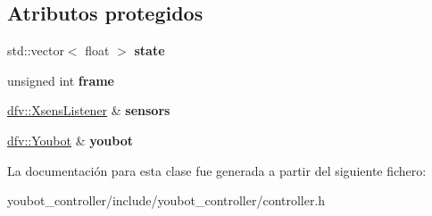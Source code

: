 \subsection*{\-Atributos protegidos}
\begin{DoxyCompactItemize}
\item 
\hypertarget{classController_a4d498383044891557b80a6b42583ba74}{std\-::vector$<$ float $>$ {\bfseries state}}\label{classController_a4d498383044891557b80a6b42583ba74}

\item 
\hypertarget{classController_aee31b087593ef8305ff0a53403839282}{unsigned int {\bfseries frame}}\label{classController_aee31b087593ef8305ff0a53403839282}

\item 
\hypertarget{classController_af615f2f2b4bb6c1cadefc6dee7df856e}{\hyperlink{classdfv_1_1XsensListener}{dfv\-::\-Xsens\-Listener} \& {\bfseries sensors}}\label{classController_af615f2f2b4bb6c1cadefc6dee7df856e}

\item 
\hypertarget{classController_a82a5fc973ed64cf343a0945c6b3874ab}{\hyperlink{classdfv_1_1Youbot}{dfv\-::\-Youbot} \& {\bfseries youbot}}\label{classController_a82a5fc973ed64cf343a0945c6b3874ab}

\end{DoxyCompactItemize}


\-La documentación para esta clase fue generada a partir del siguiente fichero\-:\begin{DoxyCompactItemize}
\item 
youbot\-\_\-controller/include/youbot\-\_\-controller/controller.\-h\end{DoxyCompactItemize}
